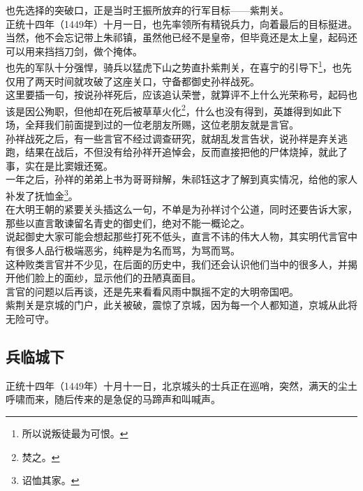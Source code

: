 \begin{multicols}{\theparacolNo}
也先选择的突破口，正是当时王振所放弃的行军目标——紫荆关。\\

正统十四年（1449年）十月一日，也先率领所有精锐兵力，向着最后的目标挺进。\\

当然，他不会忘记带上朱祁镇，虽然他已经不是皇帝，但毕竟还是太上皇，起码还可以用来挡挡刀剑，做个掩体。\\

也先的军队十分强悍，骑兵以猛虎下山之势直扑紫荆关，在喜宁的引导下\footnote{所以说叛徒最为可恨。}，也先仅用了两天时间就攻破了这座关口，守备都御史孙祥战死。\\

这里要插一句，按说孙祥死后，应该追认荣誉，就算评不上什么光荣称号，起码也该是因公殉职，但他却在死后被草草火化\footnote{焚之。}，什么也没有得到，英雄得到如此下场，全拜我们前面提到过的一位老朋友所赐，这位老朋友就是言官。\\

孙祥战死之后，有一些言官不经过调查研究，就胡乱发言告状，说孙祥是弃关逃跑，结果在战后，不但没有给孙祥开追悼会，反而直接把他的尸体烧掉，就此了事，实在是比窦娥还冤。\\

一年之后，孙祥的弟弟上书为哥哥辩解，朱祁钰这才了解到真实情况，给他的家人补发了抚恤金\footnote{诏恤其家。}。\\

在大明王朝的紧要关头插这么一句，不单是为孙祥讨个公道，同时还要告诉大家，那些以直言敢谏留名青史的御史们，绝对不能一概论之。\\

说起御史大家可能会想起那些打死不低头，直言不讳的伟大人物，其实明代言官中有很多人品行极端恶劣，纯粹是为名而骂，为骂而骂。\\

这种败类言官并不少见，在后面的历史中，我们还会认识他们当中的很多人，并揭开他们脸上的面纱，显示他们的丑陋真面目。\\

言官的问题以后再谈，还是先来看看风雨中飘摇不定的大明帝国吧。\\

紫荆关是京城的门户，此关被破，震惊了京城，因为每一个人都知道，京城从此将无险可守。\\

\subsection{兵临城下}
正统十四年（1449年）十月十一日，北京城头的士兵正在巡哨，突然，满天的尘土呼啸而来，随后传来的是急促的马蹄声和叫喊声。\\


\end{multicols}
